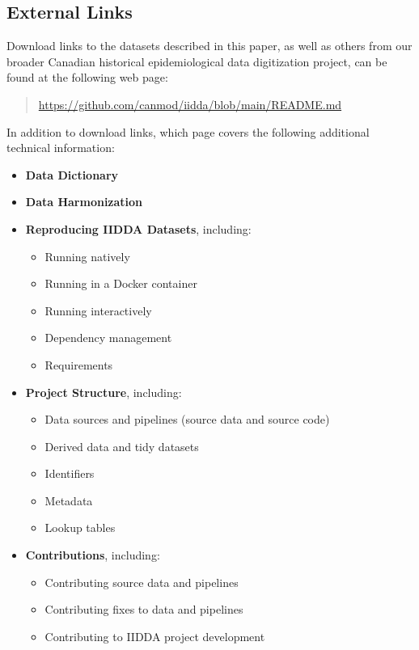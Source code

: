 \documentclass[12pt]{article}
\begin{document}
\subsection{External Links}\label{sec:appendix-external-links}

Download links to the datasets described in this paper, as well as others from our broader Canadian historical epidemiological data digitization project, can be found at the following web page:
\begin{quote}
\url{https://github.com/canmod/iidda/blob/main/README.md}
\end{quote}
In addition to download links, which page covers the following additional technical information:

\begin{itemize}
  \item \textbf{Data Dictionary}
  \item \textbf{Data Harmonization}
  \item \textbf{Reproducing IIDDA Datasets}, including:
    \begin{itemize}
      \item Running natively
      \item Running in a Docker container
      \item Running interactively
      \item Dependency management
      \item Requirements
    \end{itemize}
  \item \textbf{Project Structure}, including:
    \begin{itemize}
      \item Data sources and pipelines (source data and source code)
      \item Derived data and tidy datasets
      \item Identifiers
      \item Metadata
      \item Lookup tables
    \end{itemize}
  \item \textbf{Contributions}, including:
    \begin{itemize}
      \item Contributing source data and pipelines
      \item Contributing fixes to data and pipelines
      \item Contributing to IIDDA project development
    \end{itemize}
\end{itemize}
\end{document}
